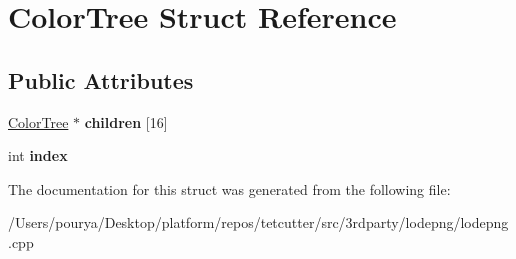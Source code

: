 \hypertarget{structColorTree}{}\section{Color\+Tree Struct Reference}
\label{structColorTree}
\subsection*{Public Attributes}
\begin{DoxyCompactItemize}
\item 
\hypertarget{structColorTree_a46a3b1d9239f5fd467ec97cd067b9a96}{}\hyperlink{structColorTree}{Color\+Tree} $\ast$ {\bfseries children} \mbox{[}16\mbox{]}\label{structColorTree_a46a3b1d9239f5fd467ec97cd067b9a96}

\item 
\hypertarget{structColorTree_ab3836a4a5981a7cf4ef553d25d9b0361}{}int {\bfseries index}\label{structColorTree_ab3836a4a5981a7cf4ef553d25d9b0361}

\end{DoxyCompactItemize}


The documentation for this struct was generated from the following file\+:\begin{DoxyCompactItemize}
\item 
/\+Users/pourya/\+Desktop/platform/repos/tetcutter/src/3rdparty/lodepng/lodepng.\+cpp\end{DoxyCompactItemize}
